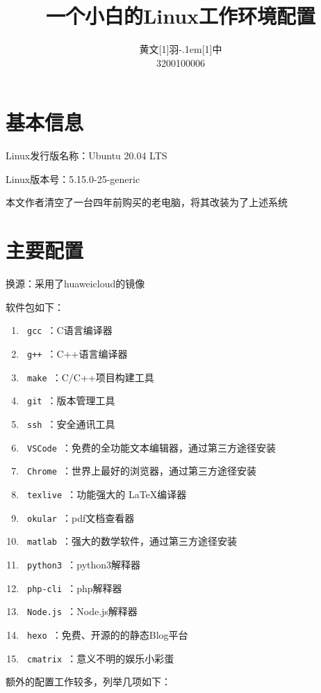 \documentclass[UTF8]{ctexart}
\title{\textbf{一个小白的Linux工作环境配置}}
\author{\CJKfamily{kai} 黄文\hbox{\scalebox{0.6}[1]{羽}\kern-.1em\scalebox{0.5}[1]{中}}\\3200100006}
\begin{document}
\maketitle

\section{基本信息}

Linux发行版名称：Ubuntu 20.04 LTS

Linux版本号：5.15.0-25-generic

本文作者清空了一台四年前购买的老电脑，将其改装为了上述系统

\section{主要配置}

换源：采用了huaweicloud的镜像

软件包如下：

\begin{enumerate}[itemindent=2em]
    \setlength{\itemsep}{-5pt}
    \item \verb| gcc |：C语言编译器
    \item \verb| g++ |：C++语言编译器
    \item \verb| make |：C/C++项目构建工具
    \item \verb| git |：版本管理工具
    \item \verb| ssh |：安全通讯工具
    \item \verb| VSCode |：免费的全功能文本编辑器，通过第三方途径安装
    \item \verb| Chrome |：世界上最好的浏览器，通过第三方途径安装
    \item \verb| texlive |：功能强大的 \LaTeX 编译器
    \item \verb| okular |：pdf文档查看器
    \item \verb| matlab |：强大的数学软件，通过第三方途径安装
    \item \verb| python3 |：python3解释器
    \item \verb| php-cli |：php解释器
    \item \verb| Node.js |：Node.js解释器
    \item \verb| hexo |：免费、开源的的静态Blog平台
    \item \verb| cmatrix |：意义不明的娱乐小彩蛋
\end{enumerate}

额外的配置工作较多，列举几项如下：\cite{name1}
\end{document}
